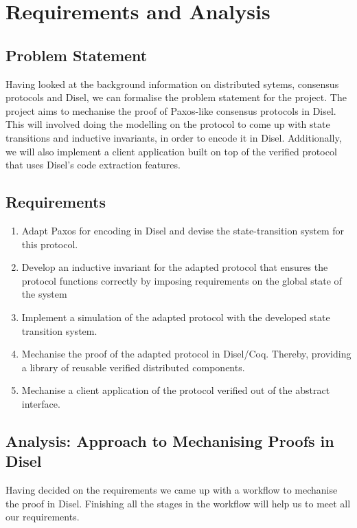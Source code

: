 \chapter{Requirements and Analysis}

\section{Problem Statement}
Having looked at the background information on distributed sytems, consensus protocols
and Disel, we can formalise the problem statement for the project.
The project aims to mechanise the proof of Paxos-like consensus protocols in
Disel. This will involved doing the modelling on the protocol to come up with
state transitions and inductive invariants, in order to encode it in Disel.
Additionally, we will also implement a client application built on top
of the verified protocol that uses Disel's code extraction features.

\section{Requirements}
\begin{enumerate}
  \item Adapt Paxos for encoding in Disel and devise the state-transition system for this protocol.
  \item Develop an inductive invariant for the adapted protocol that
    ensures the protocol functions correctly by imposing requirements on the global state of the system
  \item Implement a simulation of the adapted protocol with the developed state transition system.
  \item Mechanise the proof of the adapted protocol in Disel/Coq.
    Thereby, providing a library of reusable verified distributed components.
  \item Mechanise a client application of the protocol verified out of the abstract interface.
\end{enumerate}

\vspace{-5mm}
\section{Analysis: Approach to Mechanising Proofs in Disel}
Having decided on the requirements we came up with a workflow to
mechanise the proof in Disel. Finishing all the stages in the workflow
will help us to meet all our requirements.

